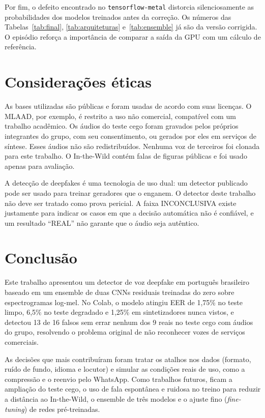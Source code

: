 Por fim, o defeito encontrado no \texttt{tensorflow-metal} distorcia silenciosamente as probabilidades dos modelos treinados antes da correção. Os números das Tabelas~\ref{tab:final}, \ref{tab:arquiteturas} e~\ref{tab:ensemble} já são da versão corrigida. O episódio reforça a importância de comparar a saída da GPU com um cálculo de referência.


\section{Considerações éticas}
\label{sec:etica}

As bases utilizadas são públicas e foram usadas de acordo com suas licenças. O MLAAD, por exemplo, é restrito a uso não comercial, compatível com um trabalho acadêmico. Os áudios do teste cego foram gravados pelos próprios integrantes do grupo, com seu consentimento, ou gerados por eles em serviços de síntese. Esses áudios não são redistribuídos. Nenhuma voz de terceiros foi clonada para este trabalho. O In-the-Wild contém falas de figuras públicas e foi usado apenas para avaliação.

A detecção de deepfakes é uma tecnologia de uso dual: um detector publicado pode ser usado para treinar geradores que o enganem. O detector deste trabalho não deve ser tratado como prova pericial. A faixa INCONCLUSIVA existe justamente para indicar os casos em que a decisão automática não é confiável, e um resultado ``REAL'' não garante que o áudio seja autêntico.


\section{Conclusão}
\label{sec:conclusao}

Este trabalho apresentou um detector de voz deepfake em português brasileiro baseado em um ensemble de duas CNNs residuais treinadas do zero sobre espectrogramas log-mel. No Colab, o modelo atingiu EER de 1,75\% no teste limpo, 6,5\% no teste degradado e 1,25\% em sintetizadores nunca vistos, e detectou 13 de 16 falsos sem errar nenhum dos 9 reais no teste cego com áudios do grupo, resolvendo o problema original de não reconhecer vozes de serviços comerciais.

As decisões que mais contribuíram foram tratar os atalhos nos dados (formato, ruído de fundo, idioma e locutor) e simular as condições reais de uso, como a compressão e o reenvio pelo WhatsApp. Como trabalhos futuros, ficam a ampliação do teste cego, o uso de fala espontânea e ruidosa no treino para reduzir a distância ao In-the-Wild, o ensemble de três modelos e o ajuste fino (\textit{fine-tuning}) de redes pré-treinadas.


